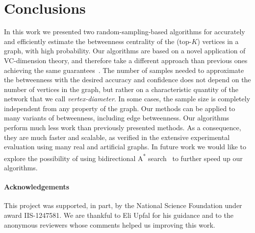 \section{Conclusions}\label{sec:centrsamplconcl}
In this work we presented two random-sampling-based algorithms for accurately and
efficiently estimate the betweenness centrality of the (top-$K$) vertices in a
graph, with high probability.
Our algorithms are based on a novel application of VC-dimension theory, and
therefore take a different approach than previous ones achieving the same
guarantees~\citep{BrandesP07,GeisbergerSS08,JacobKLPT05}. The number of samples
needed to approximate the betweenness with the desired accuracy and confidence
does not depend on the number of vertices in the graph, but rather on a
characteristic quantity of the network that we call
\emph{vertex-diameter}. In some cases, the sample size is completely
independent from any property of the graph. %
\ifproof
Our methods can be applied to many variants of betweenness, including edge
betweenness. %
\fi
Our algorithms perform much less work than previously presented methods. %
As a consequence, they are much faster and
scalable, as verified in the extensive experimental
evaluation using many real and artificial graphs. In future work we would like
to explore the possibility of using bidirectional A\textsuperscript{*}
search~\citep{Pohl69,KaindlK97} to further speed up our algorithms.  

\paragraph*{Acknowledgements} This project was supported, in part, by the
National Science Foundation under award IIS-1247581. We are thankful to Eli
Upfal for his guidance and to the anonymous reviewers whose comments helped us
improving this work.


